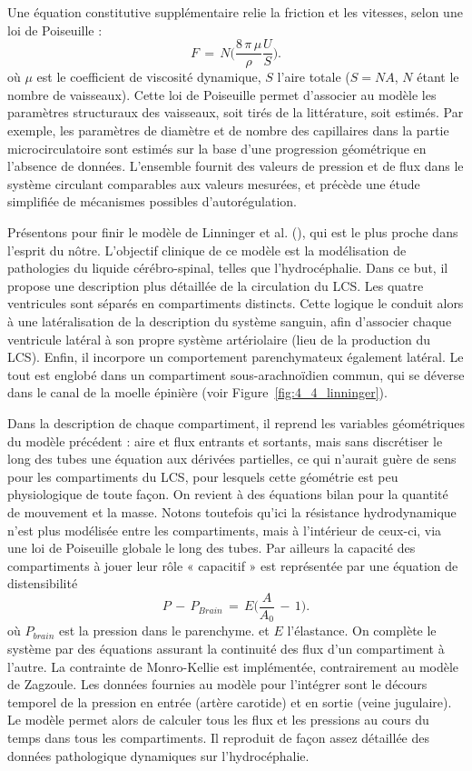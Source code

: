 Une équation constitutive
supplémentaire relie la friction et les vitesses, selon une loi de Poiseuille :
\begin{equation}
\label{eq:poiseuille}
F\,=\,N\biggl(\frac{8\,\pi\,\mu}{\rho}\frac{U}{S}\biggr).
\end{equation}
où $\mu$ est le coefficient de viscosité dynamique, $S$ l'aire totale ($S = NA$, $N$ étant le nombre de vaisseaux). Cette loi de Poiseuille permet d'associer au modèle les paramètres structuraux des vaisseaux, soit tirés
de la littérature, soit estimés. Par exemple, les paramètres de diamètre et de nombre des capillaires
dans la partie microcirculatoire sont estimés sur la base d'une progression géométrique en l'absence
de données. L'ensemble fournit des valeurs de pression et de flux dans le système circulant
comparables aux valeurs mesurées, et précède une étude simplifiée de mécanismes possibles
d'autorégulation.

Présentons pour finir le modèle de Linninger et al. (\cite{Linninger2009}), qui est le plus proche dans l'esprit du
nôtre. L'objectif clinique de ce modèle est la modélisation de pathologies du liquide cérébro-spinal,
telles que l'hydrocéphalie. Dans ce but, il propose une description plus détaillée de la circulation du
LCS. Les quatre ventricules sont séparés en compartiments distincts. Cette logique le conduit alors à
une latéralisation de la description du système sanguin, afin d'associer chaque ventricule latéral à son
propre système artériolaire (lieu de la production du LCS). Enfin, il incorpore un comportement
parenchymateux également latéral. Le tout est englobé dans un compartiment sous-arachnoïdien
commun, qui se déverse dans le canal de la moelle épinière (voir Figure~\ref{fig:4_4_linninger}). 

Dans la description de chaque compartiment, il reprend les variables géométriques du modèle précédent : aire et flux
entrants et sortants, mais sans discrétiser le long des tubes une équation aux dérivées partielles, ce
qui n'aurait guère de sens pour les compartiments du LCS, pour lesquels cette géométrie est peu
physiologique de toute façon. On revient à des équations bilan pour la quantité de mouvement et la
masse. Notons toutefois qu'ici la résistance hydrodynamique n'est plus modélisée entre les
compartiments, mais à l'intérieur de ceux-ci, via une loi de Poiseuille globale le long des tubes. Par
ailleurs la capacité des compartiments à jouer leur rôle « capacitif » est représentée par une équation
de distensibilité
\begin{equation}
P\,-\,P_{Brain}\,=\,E\biggl(\frac{A}{A_0}\,-\,1\biggr).
\end{equation}
où $P_{brain}$ est la pression dans le parenchyme. et $E$ l'élastance. On complète le système par des équations assurant la continuité des flux d'un compartiment à
l'autre. La contrainte de Monro-Kellie est implémentée, contrairement au modèle de Zagzoule. Les
données fournies au modèle pour l'intégrer sont le décours temporel de la pression en entrée (artère
carotide) et en sortie (veine jugulaire). Le modèle permet alors de calculer tous les flux et les pressions
au cours du temps dans tous les compartiments. Il reproduit de façon assez détaillée des données
pathologique dynamiques sur l'hydrocéphalie.

